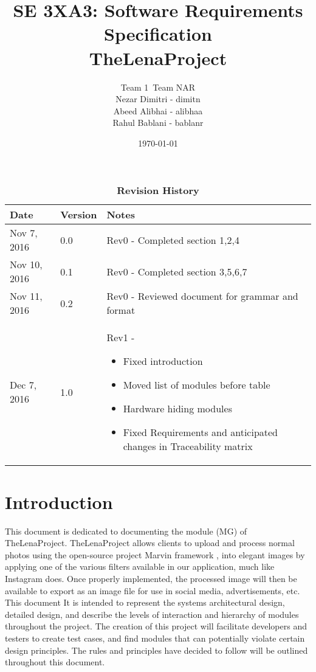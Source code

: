 \documentclass[12pt, titlepage]{article}
\title{SE 3XA3: Software Requirements Specification\\TheLenaProject}
\author{Team 1\, Team NAR
		 \\ Nezar Dimitri - dimitn
		 \\ Abeed Alibhai - alibhaa
		 \\ Rahul Bablani - bablanr
}
\date{\today}
\begin{document}
\maketitle
{}
\tableofcontents
\listoftables
\listoffigures

\begin{table}[htbp]
\caption{\bf Revision History}
\begin{tabularx}{\textwidth}{p{3cm}p{2cm}X}
\toprule {\bf Date} & {\bf Version} & {\bf Notes}\\
\midrule
Nov 7, 2016 & 0.0 & Rev0 - Completed section 1,2,4 \\
Nov 10, 2016 & 0.1 & Rev0 - Completed section 3,5,6,7 \\
Nov 11, 2016 & 0.2 & Rev0 - Reviewed document for grammar and format\\
Dec 7, 2016 & 1.0 & Rev1 - 
\begin{itemize}
	\item Fixed introduction
	\item Moved list of modules before table
	\item Hardware hiding modules
	\item Fixed Requirements and anticipated changes in Traceability matrix
\end{itemize}

\end{tabularx}
\end{table}

\clearpage




\section{Introduction}

This document is dedicated to documenting the module (MG) of
TheLenaProject. TheLenaProject allows clients to upload and process normal photos using the open-source project Marvin framework , into elegant images by applying one of the various filters available in our application, much like Instagram does. Once properly implemented, the processed image will then be available to export
as an image file for use in social media, advertisements, etc. This document It is intended to represent the systems architectural design, detailed design, and describe the levels of interaction and hierarchy of modules throughout the project. The creation of this project will facilitate developers and testers to create test cases, and find modules that can potentially violate certain design principles. The rules and principles have decided to follow will be outlined throughout this document.
\end{document}
